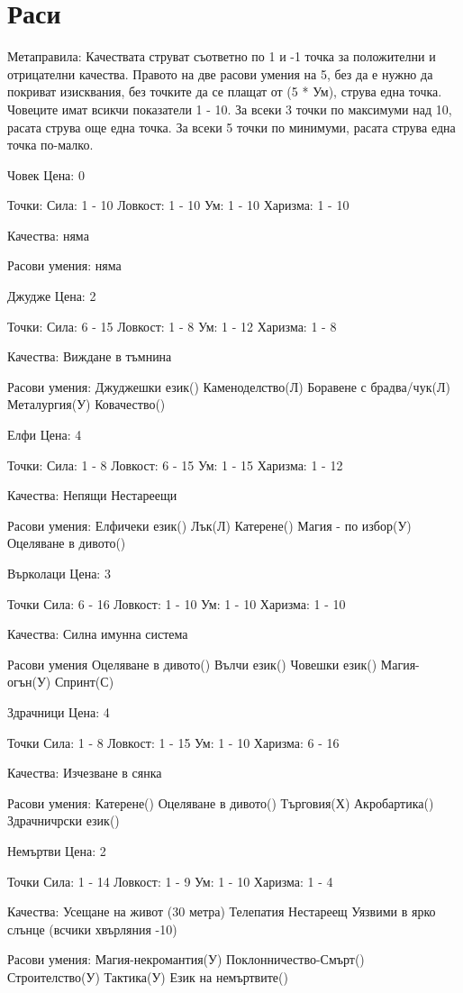 \section{Раси}
Метаправила:
Качествата струват съответно по 1 и -1 точка за положителни и отрицателни качества.
Правото на две расови умения на 5, без да е нужно да покриват изисквания, без точките да се плащат от (5 * Ум), струва една точка.
Човеците имат всикчи показатели 1 - 10.
За всеки 3 точки по максимуми над 10, расата струва още една точка.
За всеки 5 точки по минимуми, расата струва една точка по-малко.



Човек
Цена: 0

Точки:
Сила: 1 - 10
Ловкост: 1 - 10
Ум: 1 - 10
Харизма: 1 - 10

Качества:
няма

Расови умения:
няма


Джудже
Цена: 2

Точки:
Сила: 6 - 15 
Ловкост: 1 - 8
Ум: 1 - 12
Харизма: 1 - 8

Качества:
Виждане в тъмнина

Расови умения:
Джуджешки език()
Каменоделство(Л)
Боравене с брадва/чук(Л)
Металургия(У)
Ковачество()


Елфи
Цена: 4

Точки:
Сила: 1 - 8
Ловкост: 6 - 15
Ум: 1 - 15
Харизма: 1 - 12

Качества:
Непящи
Нестареещи

Расови умения:
Елфичеки език()
Лък(Л)
Катерене()
Магия - по избор(У)
Оцеляване в дивото()


Върколаци
Цена: 3

Точки
Сила: 6 - 16
Ловкост: 1 - 10
Ум: 1 - 10
Харизма: 1 - 10

Качества:
Силна имунна система

Расови умения
Оцеляване в дивото()
Вълчи език()
Човешки език()
Магия-огън(У)
Спринт(С)


Здрачници
Цена: 4

Точки
Сила: 1 - 8
Ловкост: 1 - 15
Ум: 1 - 10
Харизма: 6 - 16

Качества:
Изчезване в сянка

Расови умения:
Катерене()
Оцеляване в дивото()
Търговия(Х)
Акробартика()
Здрачничрски език()


Немъртви
Цена: 2

Точки
Сила: 1 - 14
Ловкост: 1 - 9
Ум: 1 - 10
Харизма: 1 - 4

Качества:
Усещане на живот (30 метра)
Телепатия
Нестареещ
Уязвими в ярко слънце (всчики хвърляния -10)

Расови умения:
Магия-некромантия(У)
Поклонничество-Смърт()
Строителство(У)
Тактика(У)
Език на немъртвите()
